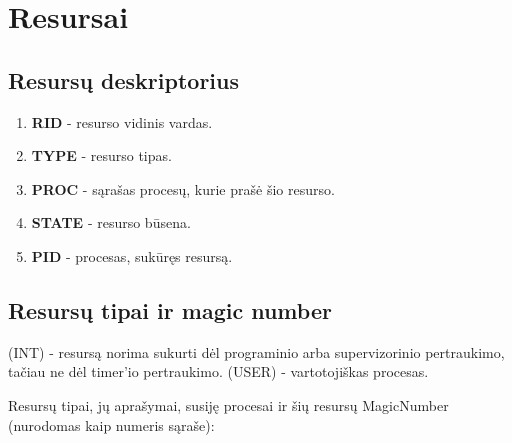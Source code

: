 \section{Resursai}
	\subsection{Resursų deskriptorius}
		\begin{enumerate}
			\item \textbf{RID} - resurso vidinis vardas.
			\item \textbf{TYPE} - resurso tipas.
			\item \textbf{PROC} - sąrašas procesų, kurie prašė šio resurso.
			\item \textbf{STATE} - resurso būsena.
			\item \textbf{PID} - procesas, sukūręs resursą.
			\textbf{}
		\end{enumerate}
	\subsection{Resursų tipai ir magic number}
		
		(INT) - resursą norima sukurti dėl programinio arba supervizorinio pertraukimo, tačiau ne dėl timer'io pertraukimo.
		(USER) - vartotojiškas procesas.
		
		Resursų tipai, jų aprašymai, susiję procesai ir šių resursų MagicNumber (nurodomas kaip numeris sąraše):\\
		
